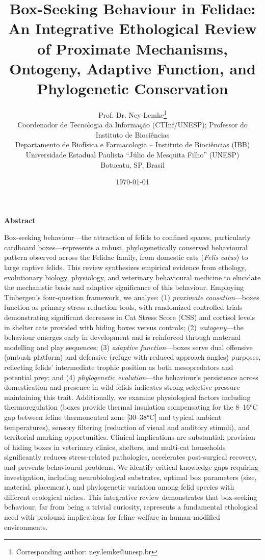 \documentclass[12pt,a4paper]{article}
\title{\textbf{Box-Seeking Behaviour in Felidae: An Integrative Ethological Review of Proximate Mechanisms, Ontogeny, Adaptive Function, and Phylogenetic Conservation}}
\author{
    Prof. Dr. Ney Lemke\thanks{Corresponding author: ney.lemke@unesp.br} \\
    \small Coordenador de Tecnologia da Informação (CTInf/UNESP); Professor do Instituto de Biociências \\
    \small Departamento de Biofísica e Farmacologia – Instituto de Biociências (IBB) \\
    \small Universidade Estadual Paulista “Júlio de Mesquita Filho” (UNESP) \\
    \small Botucatu, SP, Brasil
}
\date{\today}
\begin{document}
\maketitle

\newpage

\begin{center}
\textbf{\Large Abstract}
\end{center}

\noindent
Box-seeking behaviour—the attraction of felids to confined spaces, particularly cardboard boxes—represents a robust, phylogenetically conserved behavioural pattern observed across the Felidae family, from domestic cats (\textit{Felis catus}) to large captive felids. This review synthesizes empirical evidence from ethology, evolutionary biology, physiology, and veterinary behavioural medicine to elucidate the mechanistic basis and adaptive significance of this behaviour. Employing Tinbergen's four-question framework, we analyse: (1) \textit{proximate causation}—boxes function as primary stress-reduction tools, with randomized controlled trials demonstrating significant decreases in Cat Stress Score (CSS) and cortisol levels in shelter cats provided with hiding boxes versus controls; (2) \textit{ontogeny}—the behaviour emerges early in development and is reinforced through maternal modelling and play sequences; (3) \textit{adaptive function}—boxes serve dual offensive (ambush platform) and defensive (refuge with reduced approach angles) purposes, reflecting felids' intermediate trophic position as both mesopredators and potential prey; and (4) \textit{phylogenetic evolution}—the behaviour's persistence across domestication and presence in wild felids indicates strong selective pressure maintaining this trait. Additionally, we examine physiological factors including thermoregulation (boxes provide thermal insulation compensating for the 8–16°C gap between feline thermoneutral zone [30–38°C] and typical ambient temperatures), sensory filtering (reduction of visual and auditory stimuli), and territorial marking opportunities. Clinical implications are substantial: provision of hiding boxes in veterinary clinics, shelters, and multi-cat households significantly reduces stress-related pathologies, accelerates post-surgical recovery, and prevents behavioural problems. We identify critical knowledge gaps requiring investigation, including neurobiological substrates, optimal box parameters (size, material, placement), and phylogenetic variation among felid species with different ecological niches. This integrative review demonstrates that box-seeking behaviour, far from being a trivial curiosity, represents a fundamental ethological need with profound implications for feline welfare in human-modified environments.
\end{document}
